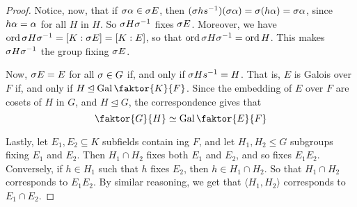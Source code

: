 \begin{proof}
       Notice, now, that if $\sigma{\alpha} \in \sigma{E}$, then
       $(\sigma{h}s^{-1})(\sigma{\alpha})=\sigma{(h\alpha)}=\sigma{\alpha}$, since $h\alpha=\alpha$ for all $H$ in
        $H$. So  $\sigma{H}\sigma^{-1}$ fixes $\sigma{E}$. Moreover, we have
        $\operatorname{ord}{\sigma{H}\sigma^{-1}}=[K:\sigma{E}]=[K:E]$, so that
        $\operatorname{ord}{\sigma{H}\sigma^{-1}}=\operatorname{ord}{H}$. This makes $\sigma{H}\sigma^{-1}$ the group
        fixing $\sigma{E}$.

        Now, $\sigma{E}=E$ for all $\sigma \in G$ if, and only if  $\sigma{H}s^{-1}=H$. That
        is, $E$ is Galois over $F$ if, and only if  $H \unlhd
        \Gal{\faktor{K}{F}}$. Since the embedding of $E$ over  $F$ are cosets of
         $H$ in  $G$, and  $H \unlhd G$, the correspondence gives that
         \begin{equation*}
             \faktor{G}{H} \simeq \Gal{\faktor{E}{F}}
         \end{equation*}

         Lastly, let $E_1,E_2 \subseteq K$ subfields contain ing $F$, and let
         $H_1,H_2 \leq G$ subgroups fixing $E_1$ and $E_2$. Then $H_1 \cap H_2$
         fixes both $E_1$ and $E_2$, and so fixes $E_1E_2$. Conversely, if $h
         \in H_1$ such that $h$ fixes $E_2$, then $h \in H_1 \cap H_2$. So that
         $H_1 \cap H_2$ corresponds to $E_1E_2$. By similar reasoning, we get
         that $\langle H_1, H_2 \rangle$ corresponds to $E_1 \cap E_2$.
\end{proof}

